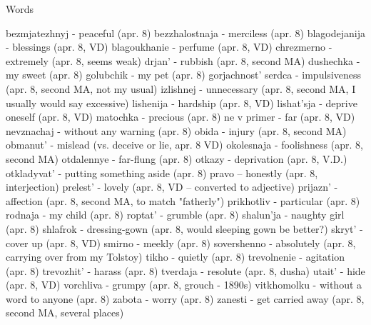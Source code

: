 Words

bezmjatezhnyj - peaceful (apr. 8)
bezzhalostnaja - merciless (apr. 8)
blagodejanija - blessings (apr. 8, VD)
blagoukhanie - perfume (apr. 8, VD)
chrezmerno - extremely (apr. 8, seems weak)
drjan' - rubbish (apr. 8, second MA)
dushechka - my sweet (apr. 8)
golubchik - my pet (apr. 8)
gorjachnost' serdca - impulsiveness (apr. 8, second MA, not my usual)
izlishnej - unnecessary (apr. 8, second MA, I usually would say excessive)
lishenija - hardship (apr. 8, VD)
lishat'sja - deprive oneself (apr. 8, VD)
matochka - precious (apr. 8)
ne v primer - far (apr. 8, VD)
nevznachaj - without any warning (apr. 8)
obida - injury (apr. 8, second MA)
obmanut' - mislead (vs. deceive or lie, apr. 8 VD)
okolesnaja - foolishness (apr. 8, second MA)
otdalennye - far-flung (apr. 8)
otkazy - deprivation (apr. 8, V.D.)
otkladyvat' - putting something aside (apr. 8)
pravo -- honestly (apr. 8, interjection)
prelest' - lovely (apr. 8, VD -- converted to adjective)
prijazn' - affection (apr. 8, second MA, to match "fatherly")
prikhotliv - particular (apr. 8)
rodnaja - my child (apr. 8)
roptat' - grumble (apr. 8)
shalun'ja - naughty girl (apr. 8)
shlafrok - dressing-gown (apr. 8, would sleeping gown be better?)
skryt' - cover up (apr. 8, VD)
smirno - meekly (apr. 8)
sovershenno - absolutely (apr. 8, carrying over from my Tolstoy)
tikho - quietly (apr. 8)
trevolnenie - agitation (apr. 8)
trevozhit' - harass (apr. 8)
tverdaja - resolute (apr. 8, dusha)
utait' - hide (apr. 8, VD)
vorchliva - grumpy (apr. 8, grouch - 1890s)
vitkhomolku - without a word to anyone (apr. 8)
zabota - worry (apr. 8)
zanesti - get carried away (apr. 8, second MA, several places)